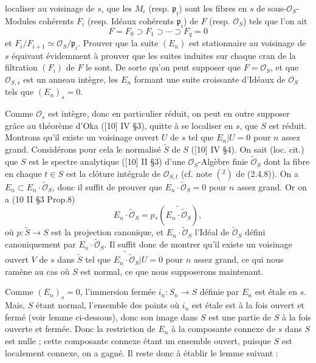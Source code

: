 localiser au voisinage de $s$, que les $M_i$ (resp. $\mathfrak p_i$) sont les fibres en $s$ de sous-$\mathcal O_S$-Modules cohérents $F_i$ (resp. Idéaux cohérents $\mathfrak p_i$) de $F$ (resp. $\mathcal O_S$) tels que l'on ait
\[
 F=F_0\supset F_1\supset\cdots\supset F_q=0
\]
et $F_i/F_{i+1}\simeq\mathcal O_S/\mathfrak p_i$. Prouver que la suite $(E_n)$ est stationnaire au voisinage de $s$ équivaut évidemment à prouver que les suites induites sur chaque cran de la filtration $(F_i)$ de $F$ le sont. De sorte qu'on peut supposer que $F=\mathcal O_S$, et que $\mathcal O_{S,s}$ est un anneau intègre, les $E_n$ formant une suite croissante d'Idéaux de $\mathcal O_S$ tels que $(E_n)_s=0$.

Comme $\mathcal O_s$ est intègre, donc en particulier réduit, on peut en outre supposer grâce au théorème d'Oka ([10] IV \S3), quitte à se localiser en $s$, que $S$ est réduit. Montrons qu'il existe un voisinage ouvert $U$ de $s$ tel que $E_n|U=0$ pour $n$ assez grand. Considérons pour cela le normalisé $\widetilde S$ de $S$ ([10] IV \S4). On sait (loc. cit.) que $S$ est le spectre analytique ([10] II \S3) d'une $\mathcal O_S$-Algèbre finie $\widetilde{\mathcal O}_S$ dont la fibre en chaque $t\in S$ est la clôture intégrale de $\mathcal O_{S,t}$ (cf. note $(^2)$ de (2.4.8)). On a $E_n\subset E_n\cdot\widetilde{\mathcal O}_S$, donc il suffit de prouver que $E_n\cdot\widetilde{\mathcal O}_S=0$ pour $n$ assez grand. Or on a (10 II \S3 Prop.8)
\[
 E_n\cdot\widetilde{\mathcal O}_S = p_*(\widetilde{E_n\cdot\widetilde{\mathcal O}_S}),
\]
où $p:\widetilde S\longrightarrow S$ est la projection canonique, et $E_n\cdot\widetilde{\mathcal O}_S$ l'Idéal de $\widetilde{\mathcal O}_S$ défini canoniquement par $E_n\cdot\widetilde{\mathcal O}_S$. Il suffit donc de montrer qu'il existe un voisinage ouvert $V$ de $s$ dans $\widetilde S$ tel que $\widetilde{E_n\cdot\widetilde{\mathcal O}_S}|U=0$ pour $n$ assez grand, ce qui nous ramène au cas où $S$ est normal, ce que nous supposerons maintenant.

Comme $(E_n)_s=0$, l'immersion fermée $i_n:S_n\longrightarrow S$ définie par $E_n$ est étale en $s$. Mais, $S$ étant normal, l'ensemble des points où $i_n$ est étale est à la fois ouvert et fermé (voir lemme ci-dessous), donc son image dans $S$ est une partie de $S$ à la fois ouverte et fermée. Donc la restriction de $E_n$ à la composante connexe de $s$ dans $S$ est nulle ; cette composante connexe étant un ensemble ouvert, puisque $S$ est localement connexe, on a gagné. Il reste donc à établir le lemme suivant :


